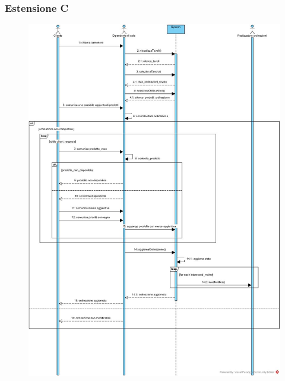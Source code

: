 \subsubsection{Estensione C}
\begin{figure}[H]
	\centering
	\includegraphics[width=1\textwidth]{Immagini/SSD Gestisci Ordinazione (EstensioneC - Aggiungi prodotto).jpg}
\end{figure}

